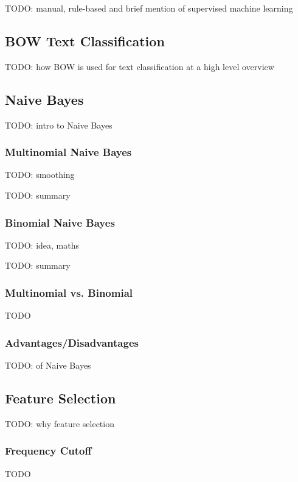 \documentclass{article}
\begin{document}
TODO: manual, rule-based and  brief mention of supervised machine learning

\subsection{BOW Text Classification}

TODO: how BOW is  used for text classification at a high level overview

\subsection{Naive Bayes}

TODO: intro to Naive Bayes

\subsubsection{Multinomial Naive Bayes}

TODO: smoothing

TODO: summary

\subsubsection{Binomial Naive Bayes}

TODO: idea, maths

TODO: summary

\subsubsection{Multinomial vs. Binomial}

TODO

\subsubsection{Advantages/Disadvantages}

TODO: of Naive Bayes

\subsection{Feature Selection}

TODO: why feature selection

\subsubsection{Frequency Cutoff}

TODO
\end{document}
